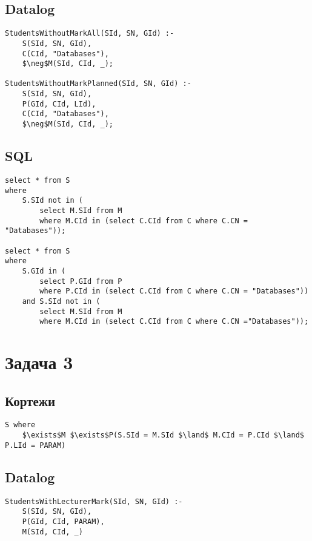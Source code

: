 \documentclass{article}
\begin{document}
\subsection{Datalog}
\begin{lstlisting}[mathescape=true]
StudentsWithoutMarkAll(SId, SN, GId) :-
    S(SId, SN, GId),
    C(CId, "Databases"),
    $\neg$M(SId, CId, _);

StudentsWithoutMarkPlanned(SId, SN, GId) :-
    S(SId, SN, GId),
    P(GId, CId, LId),
    C(CId, "Databases"),
    $\neg$M(SId, CId, _);
\end{lstlisting}

\subsection{SQL}
\begin{lstlisting}[mathescape=true]
select * from S
where
    S.SId not in (
        select M.SId from M
        where M.CId in (select C.CId from C where C.CN = "Databases"));

select * from S
where
    S.GId in (
        select P.GId from P
        where P.CId in (select C.CId from C where C.CN = "Databases"))
    and S.SId not in (
        select M.SId from M
        where M.CId in (select C.CId from C where C.CN ="Databases"));
\end{lstlisting}



\section{Задача 3}

\subsection{Кортежи}
\begin{lstlisting}[mathescape=true]
S where
    $\exists$M $\exists$P(S.SId = M.SId $\land$ M.CId = P.CId $\land$ P.LId = PARAM)
\end{lstlisting}

\subsection{Datalog}
\begin{lstlisting}[mathescape=true]
StudentsWithLecturerMark(SId, SN, GId) :-
    S(SId, SN, GId),
    P(GId, CId, PARAM),
    M(SId, CId, _)
\end{lstlisting}
\end{document}
